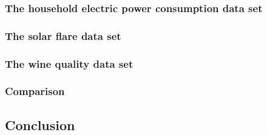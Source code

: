 \documentclass[a4paper]{article}
\begin{document}
\subsubsection{The household electric power consumption data set}
\subsubsection{The solar flare data set}
\subsubsection{The wine quality data set}
\subsubsection{Comparison}
\subsection{Conclusion}
\end{document}

